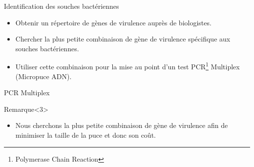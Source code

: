 \documentclass{beamer}
\begin{document}
\begin{frame}{}
\begin{block}{Identification des souches bactériennes}
	\begin{itemize}
		\item Obtenir un répertoire de gènes de virulence auprès de biologistes.
		\pause
		\item Chercher la plus petite combinaison de gène de virulence spécifique aux souches bactériennes.
		\pause
		\item Utiliser cette combinaison pour la mise au point d'un test PCR\footnote{Polymerase Chain Reaction} Multiplex (Micropuce ADN).
	\end{itemize}
\end{block}


\end{frame}

\begin{frame}{PCR Multiplex}
\begin{center}
\end{center}

\begin{block}{Remarque}<3>
	\begin{itemize}
		\item Nous cherchons la plus petite combinaison de gène de virulence afin de minimiser la taille de la puce et donc son coût.
	\end{itemize}
\end{block}
\end{frame}
\end{document}

